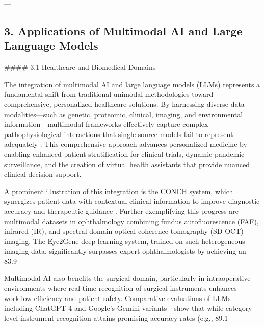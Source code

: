 \documentclass[11pt]{article}
\begin{document}
---

\subsection{3. Applications of Multimodal AI and Large Language Models}

#### 3.1 Healthcare and Biomedical Domains

The integration of multimodal AI and large language models (LLMs) represents a fundamental shift from traditional unimodal methodologies toward comprehensive, personalized healthcare solutions. By harnessing diverse data modalities—such as genetic, proteomic, clinical, imaging, and environmental information—multimodal frameworks effectively capture complex pathophysiological interactions that single-source models fail to represent adequately \cite{ref12}. This comprehensive approach advances personalized medicine by enabling enhanced patient stratification for clinical trials, dynamic pandemic surveillance, and the creation of virtual health assistants that provide nuanced clinical decision support.

A prominent illustration of this integration is the CONCH system, which synergizes patient data with contextual clinical information to improve diagnostic accuracy and therapeutic guidance \cite{ref12}. Further exemplifying this progress are multimodal datasets in ophthalmology combining fundus autofluorescence (FAF), infrared (IR), and spectral-domain optical coherence tomography (SD-OCT) imaging. The Eye2Gene deep learning system, trained on such heterogeneous imaging data, significantly surpasses expert ophthalmologists by achieving an 83.9%

Multimodal AI also benefits the surgical domain, particularly in intraoperative environments where real-time recognition of surgical instruments enhances workflow efficiency and patient safety. Comparative evaluations of LLMs—including ChatGPT-4 and Google's Gemini variants—show that while category-level instrument recognition attains promising accuracy rates (e.g., 89.1%
\end{document}
